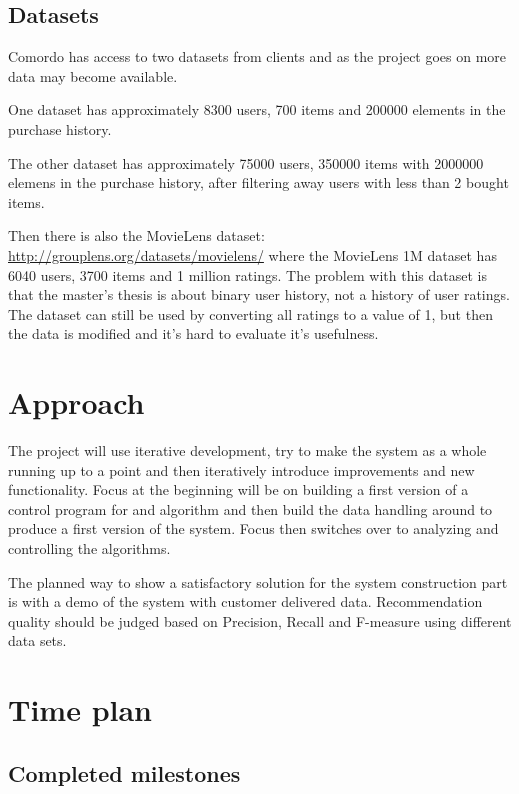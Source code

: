\documentclass[11pt]{article}
\begin{document}
\subsection*{Datasets}

Comordo has access to two datasets from clients and as the project goes on more data may become available.

One dataset has approximately 8300 users, 700 items and 200000 elements in the purchase history.

The other dataset has approximately 75000 users, 350000 items with 2000000 elemens in the purchase history, after filtering away users with less than 2 bought items.

Then there is also the MovieLens dataset: \url{http://grouplens.org/datasets/movielens/} where the MovieLens 1M dataset has 6040 users, 3700 items and 1 million ratings. The problem with this dataset is that the master's thesis is about binary user history, not a history of user ratings. The dataset can still be used by converting all ratings to a value of 1, but then the data is modified and it's hard to evaluate it's usefulness.


\section*{Approach}

The project will use iterative development, try to make the system as a whole running up to a point and then iteratively introduce improvements and new functionality. Focus at the beginning will be on building a first version of a control program for and algorithm and then build the data handling around to produce a first version of the system. Focus then switches over to analyzing and controlling the algorithms.

The planned way to show a satisfactory solution for the system construction part is with a demo of the system with customer delivered data. Recommendation quality should be judged based on Precision, Recall and F-measure using different data sets.

\newpage


\section*{Time plan}

\subsection*{Completed milestones}
\end{document}

